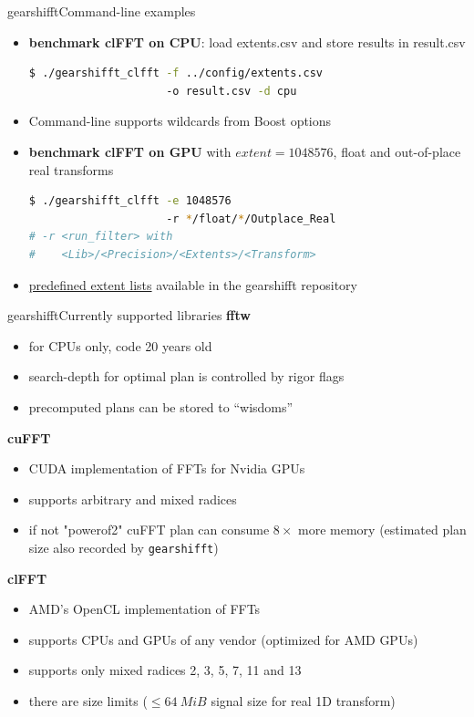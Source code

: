 \documentclass[t,11pt,hyperref={
  pdftitle = {gearshifft},
  pdfsubject = {gearshifft},
  pdfborder={0 0 0},
  colorlinks=true,
  urlcolor=red,
  citecolor=red,
  linkcolor=red,
  pdfauthor={Peter Steinbach, Matthias Werner}
  }
]{beamer}
\newcommand{\gearshifft}{\texttt{gearshifft}}
\begin{document}
\begin{frame}[fragile]{gearshifft}{Command-line examples}
  \begin{itemize}[<+->]
\item 
\textbf{benchmark clFFT on CPU}: load extents.csv and store results in result.csv
\begin{lstlisting}[numbers=none,language=bash,basicstyle=\small\ttfamily,columns=fixed]
$ ./gearshifft_clfft -f ../config/extents.csv
                     -o result.csv -d cpu
\end{lstlisting}

\item Command-line supports wildcards from Boost options
\item 
\textbf{benchmark clFFT on GPU} with $extent=1048576$, float and out-of-place real transforms
\begin{lstlisting}[numbers=none,language=bash,basicstyle=\small\ttfamily,columns=fixed]
$ ./gearshifft_clfft -e 1048576
                     -r */float/*/Outplace_Real
# -r <run_filter> with 
#    <Lib>/<Precision>/<Extents>/<Transform>
\end{lstlisting}
\item \href{https://github.com/mpicbg-scicomp/gearshifft/tree/master/config}{predefined extent lists} available in the gearshifft repository
\end{itemize}  
\end{frame}


\begin{frame}{gearshifft}{Currently supported libraries}
  {\textbf{fftw}}
  \begin{itemize}
  \item for CPUs only, code 20 years old
  \item search-depth for optimal plan is controlled by rigor flags
  \item precomputed plans can be stored to ``wisdoms''
  \end{itemize}
\pause  
  {\textbf{cuFFT}} 
  \begin{itemize}
  \item CUDA implementation of FFTs for Nvidia GPUs
  \item supports arbitrary and mixed radices
  \item if not "powerof2" cuFFT plan can consume $8\times$ more memory (estimated plan size also recorded by \gearshifft{})
  \end{itemize}
\pause
  {\textbf{clFFT}}
  \begin{itemize}
  \item AMD's OpenCL implementation of FFTs
  \item supports CPUs and GPUs of any vendor (optimized for AMD GPUs)
  \item supports only mixed radices 2, 3, 5, 7, 11 and 13
  \item there are size limits ($\le\SI{64}{MiB}$ signal size for real 1D transform)
  \end{itemize}
  
\end{frame}
\end{document}
